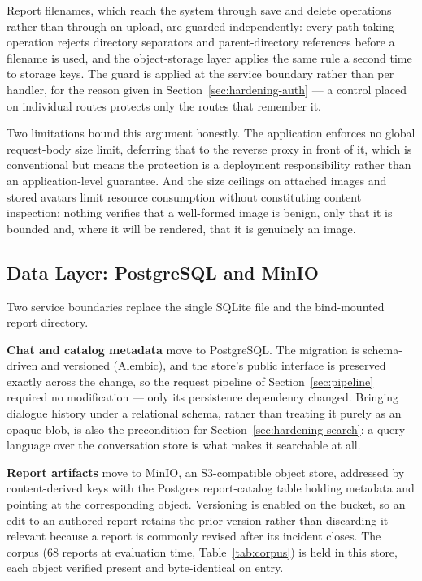 \documentclass[12pt, a4paper]{article}
\begin{document}
Report filenames, which reach the system through save and delete operations
rather than through an upload, are guarded independently: every path-taking
operation rejects directory separators and parent-directory references before a
filename is used, and the object-storage layer applies the same rule a second
time to storage keys. The guard is applied at the service boundary rather than
per handler, for the reason given in Section~\ref{sec:hardening-auth} --- a
control placed on individual routes protects only the routes that remember it.

Two limitations bound this argument honestly. The application enforces no global
request-body size limit, deferring that to the reverse proxy in front of it,
which is conventional but means the protection is a deployment responsibility
rather than an application-level guarantee. And the size ceilings on attached
images and stored avatars limit resource consumption without constituting
content inspection: nothing verifies that a well-formed image is benign, only
that it is bounded and, where it will be rendered, that it is genuinely an
image.

\subsection{Data Layer: PostgreSQL and MinIO}
\label{sec:hardening-data}

Two service boundaries replace the single SQLite file and the bind-mounted report directory.

\textbf{Chat and catalog metadata} move to PostgreSQL. The migration is schema-driven and versioned (Alembic), and the store's public interface is preserved exactly across the change, so the request pipeline of Section~\ref{sec:pipeline} required no modification --- only its persistence dependency changed. Bringing dialogue history under a relational schema, rather than treating it purely as an opaque blob, is also the precondition for Section~\ref{sec:hardening-search}: a query language over the conversation store is what makes it searchable at all.

\textbf{Report artifacts} move to MinIO, an S3-compatible object store, addressed by content-derived keys with the Postgres report-catalog table holding metadata and pointing at the corresponding object. Versioning is enabled on the bucket, so an edit to an authored report retains the prior version rather than discarding it --- relevant because a report is commonly revised after its incident closes. The corpus (68 reports at evaluation time, Table~\ref{tab:corpus}) is held in this store, each object verified present and byte-identical on entry.
\end{document}
